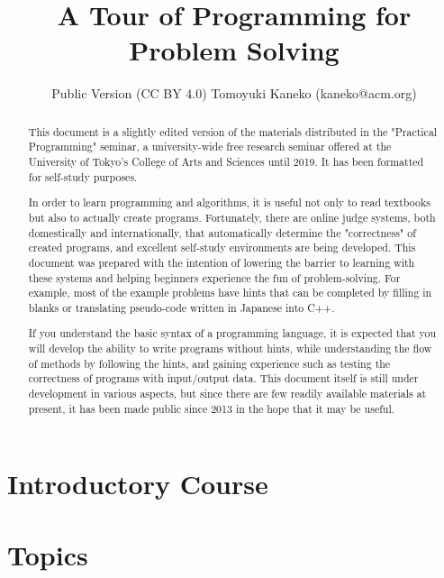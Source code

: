 \documentclass[report]{book}
\title{A Tour of Programming for Problem Solving}
\author{Public Version (CC BY 4.0) Tomoyuki Kaneko (kaneko@acm.org)}
\date{}
\begin{document}
\maketitle

\begin{versionoutside}
 
\begin{abstract}
This document is a slightly edited version of the materials distributed in the "Practical Programming" seminar, a university-wide free research seminar offered at the University of Tokyo's College of Arts and Sciences until 2019. It has been formatted for self-study purposes.

In order to learn programming and algorithms, it is useful not only to read textbooks but also to actually create programs. Fortunately, there are online judge systems, both domestically and internationally, that automatically determine the "correctness" of created programs, and excellent self-study environments are being developed. This document was prepared with the intention of lowering the barrier to learning with these systems and helping beginners experience the fun of problem-solving. For example, most of the example problems have hints that can be completed by filling in blanks or translating pseudo-code written in Japanese into C++.

If you understand the basic syntax of a programming language, it is expected that you will develop the ability to write programs without hints, while understanding the flow of methods by following the hints, and gaining experience such as testing the correctness of programs with input/output data. This document itself is still under development in various aspects, but since there are few readily available materials at present, it has been made public since 2013 in the hope that it may be useful.
\end{abstract}
\end{versionoutside}


\tableofcontents



\part{Introductory Course}



\part{Topics}
\end{document}
